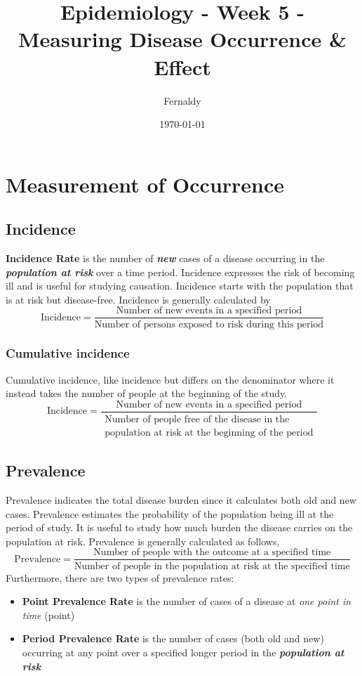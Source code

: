 \documentclass{article}
\title{Epidemiology - Week 5 - Measuring Disease Occurrence \& Effect}
\author{Fernaldy}
\date{\today}
\begin{document}
\maketitle

\section{Measurement of Occurrence}
\subsection{Incidence}
\textbf{Incidence Rate} is the number of \textbf{\textit{new}} cases of a disease occurring
in the \textbf{\textit{population at risk}} over a time period. Incidence expresses the risk of becoming ill and is useful for studying causation. Incidence starts with the population that is at risk but disease-free. Incidence is generally calculated by
\begin{equation*}
    \text{Incidence} = \dfrac{\text{Number of new events in a specified period}}{\text{Number of persons exposed to risk during this period}}
\end{equation*}
\subsubsection*{Cumulative incidence}
Cumulative incidence, like incidence but differs on the denominator where it instead takes the number of people at the beginning of the study.
\begin{equation*}
    \text{Incidence} = \dfrac{\text{Number of new events in a specified period}}{\substack{\text{Number of people free of the disease in the}\\\text{population at risk at the beginning of the period}}}
\end{equation*}

\subsection{Prevalence}
Prevalence indicates the total disease burden since it calculates both old and new cases. Prevalence estimates the probability of the population being ill at the period of study. It is useful to study how much burden the disease carries on the population at risk. Prevalence is generally calculated as follows,
\begin{equation*}
    \text{Prevalence} = \dfrac{\text{Number of people with the outcome at a specified time}}{\text{Number of people in the population at risk at the specified time}}
\end{equation*}
Furthermore, there are two types of prevalence rates:
\begin{itemize}
    \item \textbf{Point Prevalence Rate} is the number of cases of a disease at \textit{one point in time} (point)
    \item \textbf{Period Prevalence Rate} is the number of cases (both old and new) occurring at any point over a specified longer period in the \textbf{\textit{population at risk}}
\end{itemize}
\end{document}
